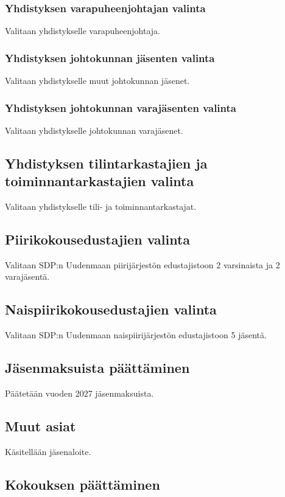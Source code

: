 \documentclass[a4paper,12pt]{article}
\begin{document}
\subsubsection{Yhdistyksen varapuheenjohtajan valinta}
Valitaan yhdistykselle varapuheenjohtaja.
\subsubsection{Yhdistyksen johtokunnan jäsenten valinta}
Valitaan yhdistykselle muut johtokunnan jäsenet.
\subsubsection{Yhdistyksen johtokunnan varajäsenten valinta}
Valitaan yhdistykselle johtokunnan varajäsenet.
\subsection{Yhdistyksen tilintarkastajien ja toiminnantarkastajien valinta}
Valitaan yhdistykselle tili- ja toiminnantarkastajat.
\subsection{Piirikokousedustajien valinta}
Valitaan SDP:n Uudenmaan piirijärjestön edustajistoon 2 varsinaista ja 2 varajäsentä.
\subsection{Naispiirikokousedustajien valinta}
Valitaan SDP:n Uudenmaan naispiirijärjestön edustajistoon 5 jäsentä.
\subsection{Jäsenmaksuista päättäminen}
Päätetään vuoden 2027 jäsenmaksuista.
\subsection{Muut asiat}
Käsitellään jäsenaloite.
\subsection{Kokouksen päättäminen}
\end{document}
